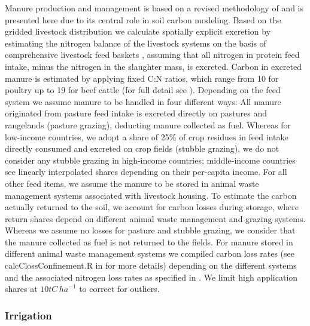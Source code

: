 \documentclass[gc, manuscript]{copernicus}
\begin{document}
Manure production and management is based on a revised methodology of \citep{bodirsky_n2o_2012} and is presented here due to its central role in soil carbon modeling. Based on the gridded livestock distribution we calculate spatially explicit excretion by estimating the nitrogen balance of the livestock systems on the basis of comprehensive livestock feed baskets \citep{weindl_livestock_2017}, assuming that all nitrogen in protein feed intake, minus the nitrogen in the slaughter mass, is excreted. Carbon in excreted manure is estimated by applying fixed C:N ratios, which range from 10 for poultry up to 19 for beef cattle (for full detail see \citep{calvo_buendia_ipcc_2019}).
Depending on the feed system we assume manure to be handled in four different ways:
All manure originated from pasture feed intake is excreted directly on pastures and rangelands (pasture grazing), deducting manure collected as fuel.
Whereas for low-income countries, we adopt a share of 25\% of crop residues in feed intake directly consumed and excreted on crop fields (stubble grazing), we do not consider any stubble grazing in high-income countries; middle-income countries see linearly interpolated shares depending on their per-capita income.
For all other feed items, we assume the manure to be stored in animal waste management systems associated with livestock housing.
To estimate the carbon actually returned to the soil, we account for carbon losses during storage, where return shares depend on different animal waste management and grazing systems. Whereas we assume no losses for pasture and stubble grazing, we consider that the manure collected as fuel is not returned to the fields. For manure stored in different animal waste management systems we compiled carbon loss rates (see calcClossConfinement.R in \citep{bodirsky_mrcommons_2020} for more details) depending on the different systems and the associated nitrogen loss rates as specified in \citep{bodirsky_n2o_2012}. We limit high application shares at \(10\unit{tC\,ha}^{-1}\) to correct for outliers.

\hypertarget{sec:irrigation}{%
\subsubsection{Irrigation}\label{sec:irrigation}}
\end{document}
